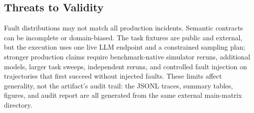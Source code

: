 \subsection{Threats to Validity}

Fault distributions may not match all production incidents. Semantic contracts can be incomplete or domain-biased. The task fixtures are public and external, but the execution uses one live LLM endpoint and a constrained sampling plan; stronger production claims require benchmark-native simulator reruns, additional models, larger task sweeps, independent reruns, and controlled fault injection on trajectories that first succeed without injected faults. These limits affect generality, not the artifact's audit trail: the JSONL traces, summary tables, figures, and audit report are all generated from the same external main-matrix directory.
